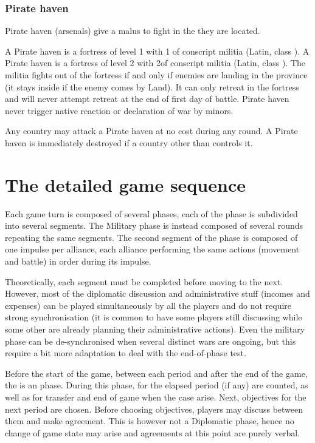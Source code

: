 \subsubsection{Pirate haven}
\aparag[Effects] Pirate haven (arsenals) give a malus to fight 
\corsaire in the \CTZ they are located.

\aparag[Military] A Pirate haven \Facemoins is a fortress of level 1 with 1\LD
of conscript militia (Latin, class \CAIII).
\bparag A Pirate haven \Faceplus is a fortress of level 2 with 2\LD of
conscript militia (Latin, class \CAIII).
\bparag The militia fights out of the fortress if and only if enemies are
landing in the province (it stays inside if the enemy comes by Land). It can
only retreat in the fortress and will never attempt retreat at the end of
first day of battle.
\bparag Pirate haven never trigger native reaction or declaration of war by
\ROTW minors.

\aparag[Destruction] Any country may attack a Pirate haven at no cost during
any round.
\bparag A Pirate haven is immediately destroyed if a country other than
 controls it.

\clearpage




\section{The detailed game sequence}

\aparag Each game turn is composed of several phases, each of the phase is
subdivided into several segments.
\bparag The Military phase is instead composed of several rounds repeating the
same segments. The second segment of the phase is composed of one impulse per
alliance, each alliance performing the same actions (movement and battle) in
order during its impulse.

\aparag Theoretically, each segment must be completed before moving to the
next.
\bparag However, most of the diplomatic discussion and administrative stuff
(incomes and expenses) can be played simultaneously by all the players and do
not require strong synchronisation (it is common to have some players still
discussing while some other are already planning their administrative
actions).
\bparag Even the military phase can be de-synchronised when several distinct
wars are ongoing, but this require a bit more adaptation to deal with the
end-of-phase test.

\bparag Before the start of the game, between each period and after the end of
the game, the is an  phase.
\bparag During this phase, \VPs for the elapsed period (if any) are counted,
as well as \VPs for transfer and end of game when the case arise.
\bparag Next, objectives for the next period are chosen.
\bparag Before choosing objectives, players may discuss between them and make
agreement. This is however not a Diplomatic phase, hence no change of game
state may arise and agreements at this point are purely verbal.

